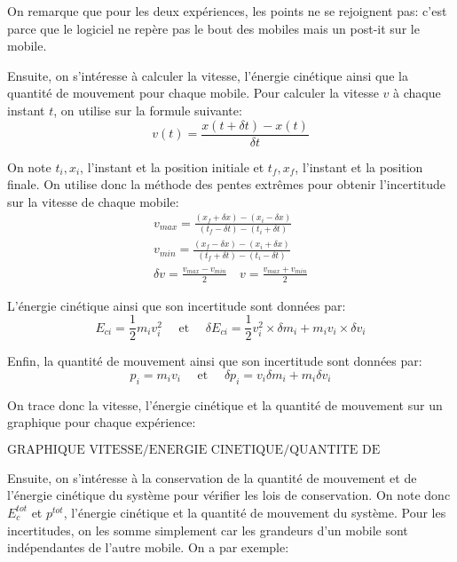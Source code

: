 \documentclass[12pt]{article}
\begin{document}
On remarque que pour les deux expériences, les points ne se rejoignent pas: c'est parce que le logiciel ne repère pas le bout des mobiles mais un post-it sur le mobile.  

Ensuite, on s'intéresse à calculer la vitesse, l'énergie cinétique ainsi que la quantité de mouvement
pour chaque mobile.
Pour calculer la vitesse $v$ à chaque instant $t$, on utilise sur la formule suivante:
\begin{equation}
    v(t) = \frac{x(t + \delta t) - x(t)}{\delta t}
\end{equation}

On note $t_i, x_i$, l'instant et la position initiale et $t_f, x_f$, l'instant et la position finale. On utilise donc la méthode
des pentes extrêmes pour obtenir l'incertitude sur la vitesse de chaque mobile:
\begin{gather*}
    v_{max} = \frac{(x_f + \delta x) - (x_i - \delta x)}{(t_f - \delta t) - (t_i + \delta t)} \\
    v_{min} = \frac{(x_f - \delta x) - (x_i + \delta x)}{(t_f + \delta t) - (t_i - \delta t)} \\
    \delta v = \frac{v_{max} - v_{min}}{2} \quad v = \frac{v_{max} + v_{min}}{2}
\end{gather*}

L'énergie cinétique ainsi que son incertitude sont données par:
\begin{equation}
    E_{ci} = \frac{1}{2}m_iv_i^2 \quad \text{ et } \quad \delta E_{ci} = \frac{1}{2}v_i^2 \times \delta m_i + m_iv_i \times \delta v_i
\end{equation}

Enfin, la quantité de mouvement ainsi que son incertitude sont données par:
\begin{equation}
    p_i = m_iv_i \quad \text{ et } \quad \delta p_i = v_i\delta m_i + m_i\delta v_i
\end{equation}

On trace donc la vitesse, l'énergie cinétique et la quantité de mouvement sur un graphique pour chaque expérience:

\[
    \text{GRAPHIQUE VITESSE/ENERGIE CINETIQUE/QUANTITE DE MOUVEMENT}
\]

\newpage
Ensuite, on s'intéresse à la conservation de la quantité de mouvement et de l'énergie cinétique du système pour
vérifier les lois de conservation. On note donc $E_c^{tot}$ et $p^{tot}$, l'énergie cinétique et la quantité de mouvement du système. 
Pour les incertitudes, on les somme simplement car les grandeurs d'un mobile sont indépendantes de l'autre mobile. On a par exemple:
\end{document}
